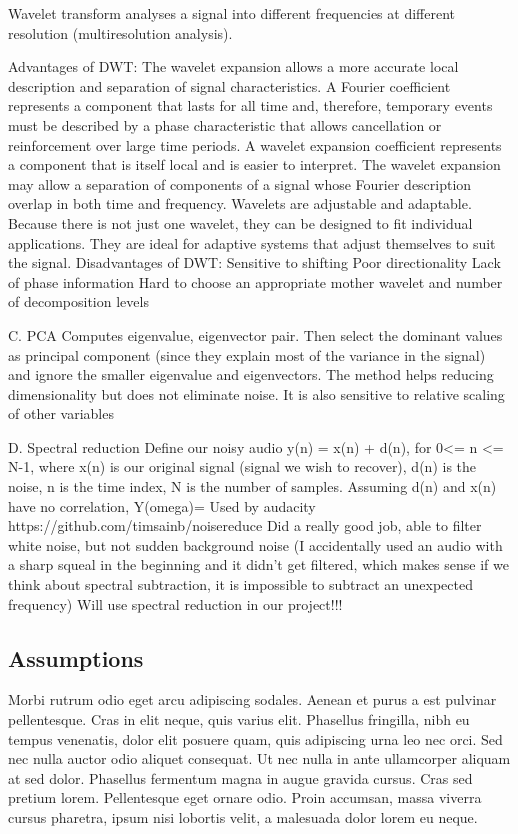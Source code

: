Wavelet transform analyses a signal into different frequencies at different resolution (multiresolution analysis). 

Advantages of DWT:
	The wavelet expansion allows a more accurate local description and separation of signal characteristics. A Fourier coefficient represents a component that lasts for all time and, therefore, temporary events must be described by a phase characteristic that allows cancellation or reinforcement over large time periods. A wavelet expansion coefficient represents a component that is itself local and is easier to interpret. The wavelet expansion may allow a separation of components of a signal whose Fourier description overlap in both time and frequency.
	Wavelets are adjustable and adaptable. Because there is not just one wavelet, they can be designed to fit individual applications. They are ideal for adaptive systems that adjust themselves to suit the signal.
Disadvantages of DWT:
	Sensitive to shifting
	Poor directionality
	Lack of phase information
	Hard to choose an appropriate mother wavelet and number of decomposition levels

C. PCA
Computes eigenvalue, eigenvector pair. Then select the dominant values as principal component (since they explain most of the variance in the signal) and ignore the smaller eigenvalue and eigenvectors.
The method helps reducing dimensionality but does not eliminate noise. It is also sensitive to relative scaling of other variables 


D. Spectral reduction
Define our noisy audio y(n) = x(n) + d(n), for 0<= n <= N-1, where x(n) is our original signal (signal we wish to recover), d(n) is the noise, n is the time index, N is the number of samples. 
Assuming d(n) and x(n) have no correlation, Y(omega)= 
Used by audacity
https://github.com/timsainb/noisereduce
	Did a really good job, able to filter white noise, but not sudden background noise (I accidentally used an audio with a sharp squeal in the beginning and it didn’t get filtered, which makes sense if we think about spectral subtraction, it is impossible to subtract an unexpected frequency)
	Will use spectral reduction in our project!!! 


\subsection{Assumptions}
Morbi rutrum odio eget arcu adipiscing sodales. Aenean et purus a est pulvinar pellentesque. Cras in elit neque, quis varius elit. Phasellus fringilla, nibh eu tempus venenatis, dolor elit posuere quam, quis adipiscing urna leo nec orci. Sed nec nulla auctor odio aliquet consequat. Ut nec nulla in ante ullamcorper aliquam at sed dolor. Phasellus fermentum magna in augue gravida cursus. Cras sed pretium lorem. Pellentesque eget ornare odio. Proin accumsan, massa viverra cursus pharetra, ipsum nisi lobortis velit, a malesuada dolor lorem eu neque.

